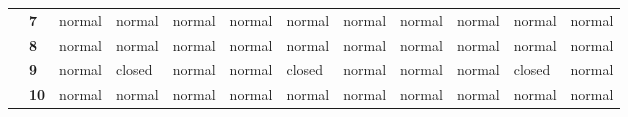 \documentclass[12pt]{article}
\begin{document}
\begin{table}[]
{\begin{tabular}{clllllllllll}
			\multicolumn{1}{c|}{}                                   & \multicolumn{1}{l|}{\textbf{7}}  & \multicolumn{1}{l|}{\cellcolor[HTML]{FFFC9E}normal} & \multicolumn{1}{l|}{\cellcolor[HTML]{FFFC9E}normal} & \multicolumn{1}{l|}{\cellcolor[HTML]{FFFC9E}normal} & \multicolumn{1}{l|}{\cellcolor[HTML]{FFFC9E}normal} & \multicolumn{1}{l|}{\cellcolor[HTML]{FFFC9E}normal} & \multicolumn{1}{l|}{\cellcolor[HTML]{FFFC9E}normal} & \multicolumn{1}{l|}{\cellcolor[HTML]{FFFC9E}normal} & \multicolumn{1}{l|}{\cellcolor[HTML]{FFFC9E}normal} & \multicolumn{1}{l|}{\cellcolor[HTML]{FFFC9E}normal} & \multicolumn{1}{l|}{\cellcolor[HTML]{FFFC9E}normal} \\ \cline{2-12}
			\multicolumn{1}{c|}{}                                   & \multicolumn{1}{l|}{\textbf{8}}  & \multicolumn{1}{l|}{\cellcolor[HTML]{FFFC9E}normal} & \multicolumn{1}{l|}{\cellcolor[HTML]{FFFC9E}normal} & \multicolumn{1}{l|}{\cellcolor[HTML]{FFFC9E}normal} & \multicolumn{1}{l|}{\cellcolor[HTML]{FFFC9E}normal} & \multicolumn{1}{l|}{\cellcolor[HTML]{FFFC9E}normal} & \multicolumn{1}{l|}{\cellcolor[HTML]{FFFC9E}normal} & \multicolumn{1}{l|}{\cellcolor[HTML]{FFFC9E}normal} & \multicolumn{1}{l|}{\cellcolor[HTML]{FFFC9E}normal} & \multicolumn{1}{l|}{\cellcolor[HTML]{FFFC9E}normal} & \multicolumn{1}{l|}{\cellcolor[HTML]{FFFC9E}normal} \\ \cline{2-12}
			\multicolumn{1}{c|}{}                                   & \multicolumn{1}{l|}{\textbf{9}}  & \multicolumn{1}{l|}{\cellcolor[HTML]{FFFC9E}normal} & \multicolumn{1}{l|}{\cellcolor[HTML]{FD6864}closed} & \multicolumn{1}{l|}{\cellcolor[HTML]{FFFC9E}normal} & \multicolumn{1}{l|}{\cellcolor[HTML]{FFFC9E}normal} & \multicolumn{1}{l|}{\cellcolor[HTML]{FD6864}closed} & \multicolumn{1}{l|}{\cellcolor[HTML]{FFFC9E}normal} & \multicolumn{1}{l|}{\cellcolor[HTML]{FFFC9E}normal} & \multicolumn{1}{l|}{\cellcolor[HTML]{FFFC9E}normal} & \multicolumn{1}{l|}{\cellcolor[HTML]{FD6864}closed} & \multicolumn{1}{l|}{\cellcolor[HTML]{FFFC9E}normal} \\ \cline{2-12}
			\multicolumn{1}{c|}{}                                   & \multicolumn{1}{l|}{\textbf{10}} & \multicolumn{1}{l|}{\cellcolor[HTML]{FFFC9E}normal} & \multicolumn{1}{l|}{\cellcolor[HTML]{FFFC9E}normal} & \multicolumn{1}{l|}{\cellcolor[HTML]{FFFC9E}normal} & \multicolumn{1}{l|}{\cellcolor[HTML]{FFFC9E}normal} & \multicolumn{1}{l|}{\cellcolor[HTML]{FFFC9E}normal} & \multicolumn{1}{l|}{\cellcolor[HTML]{FFFC9E}normal} & \multicolumn{1}{l|}{\cellcolor[HTML]{FFFC9E}normal} & \multicolumn{1}{l|}{\cellcolor[HTML]{FFFC9E}normal} & \multicolumn{1}{l|}{\cellcolor[HTML]{FFFC9E}normal} & \multicolumn{1}{l|}{\cellcolor[HTML]{FFFC9E}normal} \\ \cline{2-12}

\end{tabular}}
\end{table}
\end{document}
